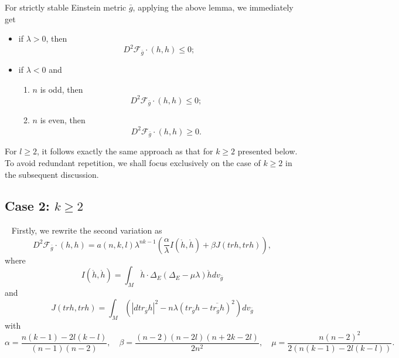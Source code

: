 \documentclass[12pt]{amsart}
\newcommand{\bg}{\bar{g}}
\numberwithin{equation}{section}
\begin{document}
For strictly stable Einstein metric $\bg$, applying the above lemma, we immediately get 
\begin{itemize}
        \item if $\lambda>0$, then
    \begin{equation*}
    D^2 \mathcal{F}_{\bg} \cdot (h,h) \leq 0;
    \end{equation*}
    \item if $\lambda<0$ and
    \begin{enumerate}
        \item $n$ is odd, then
        \begin{equation*}
        D^2\mathcal{F}_{\bg}\cdot(h,h) \leq 0;
        \end{equation*}
    \item $n$ is even, then
        \begin{equation*}
            D^2\mathcal{F}_{\bg}\cdot(h,h) \geq 0.
        \end{equation*}
    \end{enumerate}
    \end{itemize}

For $l\geq2$, it follows exactly the same approach as that for $k \geq 2$ presented below. To avoid redundant repetition, we shall focus exclusively on the case of $k \geq 2$ in the subsequent discussion.

\subsection{Case 2: $k\geq2$}
\ \newline
Firstly, we rewrite the second variation as 
\begin{equation*}
    D^2\mathcal{F}_{\bg}\cdot(h,h)=a(n,k,l)\lambda^{nk-1}\left(\frac{\alpha}{\lambda}I(\mathring{h},\mathring{h})+\beta J(trh,trh)\right),
\end{equation*}
where 
\begin{equation*}
    I(\mathring{h},\mathring{h}) = \int_M \mathring{h} \cdot \Delta_E \left( \Delta_E-\mu\lambda \right) \mathring{h} dv_{\bg}
\end{equation*}
and
\begin{equation*}
    J(trh,trh)=\int_M \left( |d tr_{\bg} h|^2-n\lambda(tr_{\bg}h-\overline{tr_{\bg}h})^2\right)dv_{\bg}
\end{equation*}
with 
\begin{equation*}
    \alpha=\frac{n(k-1)-2l(k-l)}{(n-1)(n-2)}, \quad \beta=\frac{(n-2)(n-2l)(n+2k-2l)}{2n^2}, \quad \mu=\frac{n(n-2)^2}{2\left(n(k-1)-2l(k-l)\right)}.
\end{equation*}
\end{document}
